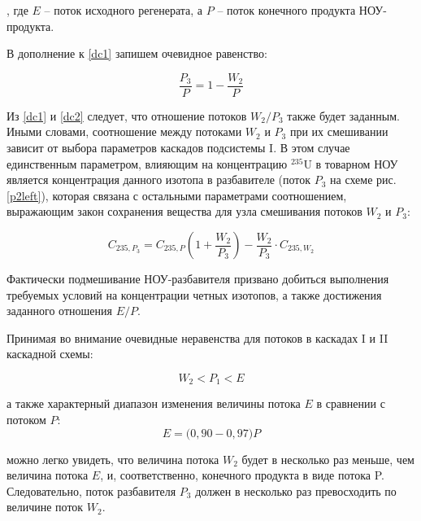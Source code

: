 , где $E$ -- поток исходного регенерата, а $P$ -- поток конечного продукта НОУ-продукта.

В дополнение к \ref{dc1} запишем очевидное равенство:

\begin{equation}
    \label{dc2}
    \frac{P_{3}}{P} = 1 - \frac{W_{2}}{P}
\end{equation}

Из \ref{dc1} и \ref{dc2} следует, что отношение потоков ${W_2}{/}{P_3}$ также будет заданным. Иными словами, соотношение между потоками $W_2$ и $P_3$ при их смешивании зависит от выбора параметров каскадов подсистемы I. В этом случае единственным параметром, влияющим на концентрацию $^{235}$U в товарном НОУ является концентрация данного изотопа в разбавителе (поток $P_3$ на схеме рис. \ref{p2left}), которая связана с остальными параметрами соотношением, выражающим закон сохранения вещества для узла смешивания потоков $W_2$ и $P_3$: 

\begin{equation}
    \label{dc3}
    C_{235,P_{3}}=C_{235,P}({1 + \frac{W_{2}}{P_{3}}}) - \frac{W_{2}}{P_{3}}\cdot C_{235,W_{2}}
\end{equation}


Фактически подмешивание НОУ-разбавителя призвано добиться выполнения требуемых условий на концентрации четных изотопов, а также достижения заданного отношения $E{/}P$.

Принимая во внимание очевидные неравенства для потоков в каскадах I и II каскадной схемы:

\begin{equation}
    \label{dc3a}
    W_{2} < P_{1} <  E
\end{equation}

а также характерный диапазон изменения величины потока $E$ в сравнении с потоком $P$:
\begin{equation}
    \label{dc3b}
    E = {(}0,90-0,97{)}P
\end{equation}

можно легко увидеть, что величина потока $W_{2}$ будет в несколько раз меньше, чем величина потока $E$, и, соответственно, конечного продукта в виде потока P. Следовательно, поток разбавителя $P_{3}$ должен в несколько раз превосходить по величине поток $W_{2}$. 

